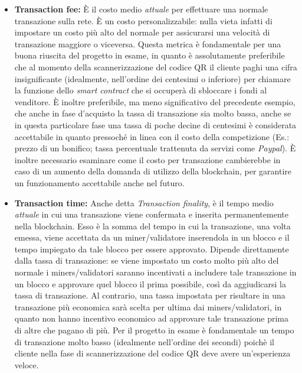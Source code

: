 \documentclass[a4paper, 12pt]{article}
\begin{document}
\begin{itemize}
\item \textbf{Transaction fee: }
È il costo medio \textit{attuale} per effettuare una normale transazione sulla rete.
È un costo personalizzabile: nulla vieta infatti di impostare un costo più alto del normale per assicurarsi una velocità di transazione maggiore o viceversa.
Questa metrica è fondamentale per una buona riuscita del progetto in esame, in quanto è assolutamente preferibile che al momento della scannerizzazione del codice QR
il cliente paghi una cifra insignificante (idealmente, nell'ordine dei centesimi o inferiore) per chiamare la funzione dello \textit{smart contract} che si occuperà di sbloccare i fondi
al venditore. È inoltre preferibile, ma meno significativo del precedente esempio, che anche in fase d'acquisto la tassa di transazione sia molto bassa, anche se
in questa particolare fase una tassa di poche decine di centesimi è considerata accettabile in quanto pressoché in linea con il costo della competizione (Es.: prezzo di un bonifico;
tassa percentuale trattenuta da servizi come \textit{Paypal}).
È inoltre necessario esaminare come il costo per transazione cambierebbe in caso di un aumento della domanda di utilizzo della blockchain, per garantire un funzionamento
accettabile anche nel futuro.\\

\item \textbf{Transaction time: }
Anche detta \textit{Transaction finality}, è il tempo medio \textit{attuale} in cui una transazione viene confermata e inserita permanentemente nella blockchain.
Esso è la somma del tempo in cui la transazione, una volta emessa, viene accettata da un miner/validatore inserendola in un blocco e il tempo impiegato da tale blocco per essere
approvato. Dipende direttamente dalla tassa di transazione: se viene impostato un costo molto più alto del normale i miners/validatori saranno incentivati a includere tale transazione
in un blocco e approvare quel blocco il prima possibile, così da aggiudicarsi la tassa di transazione. Al contrario, una tassa impostata per risultare in una transazione più economica
sarà scelta per ultima dai miners/validatori, in quanto non hanno incentivo economico ad approvare tale transazione prima di altre che pagano di più.
Per il progetto in esame è fondamentale un tempo di transazione molto basso (idealmente nell'ordine dei secondi) poichè il cliente nella fase di scannerizzazione del codice QR deve
avere un'esperienza veloce.\\


\end{itemize}
\end{document}
